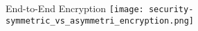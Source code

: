 \begin{frame}{End-to-End Encryption}
    \centering
    \texttt{[image: security-symmetric\_vs\_asymmetri\_encryption.png]}
\end{frame}


